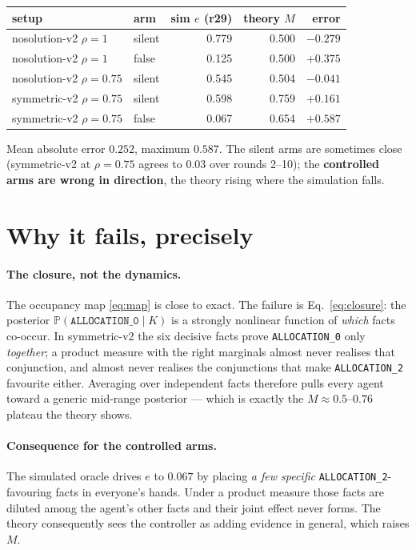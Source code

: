 \documentclass[11pt,a4paper]{article}
\newcommand{\Prob}{\mathbb{P}}\newcommand{\Ex}{\mathbb{E}}
\newcommand{\A}[1]{\texttt{ALLOCATION\_#1}}
\begin{document}
\begin{center}\small
\begin{tabular}{llrrr}\toprule
setup & arm & sim $e$ (r29) & theory $M$ & error\\\midrule
nosolution-v2 $\rho{=}1$ & silent & 0.779 & 0.500 & $-0.279$\\
nosolution-v2 $\rho{=}1$ & false & 0.125 & 0.500 & $+0.375$\\
nosolution-v2 $\rho{=}0.75$ & silent & 0.545 & 0.504 & $-0.041$\\
symmetric-v2 $\rho{=}0.75$ & silent & 0.598 & 0.759 & $+0.161$\\
symmetric-v2 $\rho{=}0.75$ & false & 0.067 & 0.654 & $+0.587$\\
\bottomrule\end{tabular}\end{center}

\noindent
Mean absolute error $0.252$, maximum $0.587$. The silent arms are sometimes
close (symmetric-v2 at $\rho=0.75$ agrees to $0.03$ over rounds 2--10); the
\textbf{controlled arms are wrong in direction}, the theory rising where the
simulation falls.

\section{Why it fails, precisely}

\paragraph{The closure, not the dynamics.} The occupancy map
\eqref{eq:map} is close to exact. The failure is Eq.~\eqref{eq:closure}: the
posterior $\Prob(\A{0}\mid K)$ is a strongly nonlinear function of \emph{which}
facts co-occur. In symmetric-v2 the six decisive facts prove \A{0} only
\emph{together}; a product measure with the right marginals almost never
realises that conjunction, and almost never realises the conjunctions that
make \A{2} favourite either. Averaging over independent facts therefore pulls
every agent toward a generic mid-range posterior --- which is exactly the
$M\approx0.5$--$0.76$ plateau the theory shows.

\paragraph{Consequence for the controlled arms.} The simulated oracle drives $e$
to $0.067$ by placing \emph{a few specific} \A{2}-favouring facts in everyone's
hands. Under a product measure those facts are diluted among the agent's other
facts and their joint effect never forms. The theory consequently sees the
controller as adding evidence in general, which raises $M$.
\end{document}
